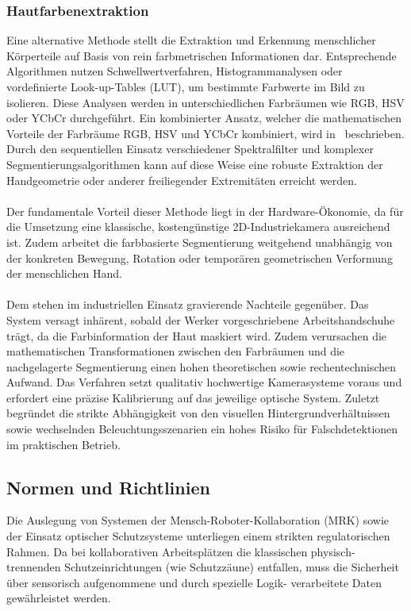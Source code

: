 \subsubsection{Hautfarbenextraktion}
Eine alternative Methode stellt die Extraktion und Erkennung menschlicher Körperteile auf Basis von rein farbmetrischen Informationen dar. Entsprechende Algorithmen nutzen Schwellwertverfahren, Histogrammanalysen oder vordefinierte Look-up-Tables (LUT), um bestimmte Farbwerte im Bild zu isolieren. Diese Analysen werden in unterschiedlichen Farbräumen wie RGB, HSV oder YCbCr durchgeführt. Ein kombinierter Ansatz, welcher die mathematischen Vorteile der Farbräume RGB, HSV und YCbCr kombiniert, wird in~\cite{Sea03} beschrieben. Durch den sequentiellen Einsatz verschiedener Spektralfilter und komplexer Segmentierungsalgorithmen kann auf diese Weise eine robuste Extraktion der Handgeometrie oder anderer freiliegender Extremitäten erreicht werden.
\\
\\Der fundamentale Vorteil dieser Methode liegt in der Hardware-Ökonomie, da für die Umsetzung eine klassische, kostengünstige 2D-Industriekamera ausreichend ist. Zudem arbeitet die farbbasierte Segmentierung weitgehend unabhängig von der konkreten Bewegung, Rotation oder temporären geometrischen Verformung der menschlichen Hand. 
\\
\\Dem stehen im industriellen Einsatz gravierende Nachteile gegenüber. Das System versagt inhärent, sobald der Werker vorgeschriebene Arbeitshandschuhe trägt, da die Farbinformation der Haut maskiert wird. Zudem verursachen die mathematischen Transformationen zwischen den Farbräumen und die nachgelagerte Segmentierung einen hohen theoretischen sowie rechentechnischen Aufwand. Das Verfahren setzt qualitativ hochwertige Kamerasysteme voraus und erfordert eine präzise Kalibrierung auf das jeweilige optische System. Zuletzt begründet die strikte Abhängigkeit von den visuellen Hintergrundverhältnissen sowie wechselnden Beleuchtungsszenarien ein hohes Risiko für Falschdetektionen im praktischen Betrieb.

\subsection{Normen und Richtlinien}
Die Auslegung von Systemen der Mensch-Roboter-Kollaboration (MRK) sowie der Einsatz optischer Schutzsysteme unterliegen einem strikten regulatorischen Rahmen. Da bei kollaborativen Arbeitsplätzen die klassischen physisch-trennenden Schutzeinrichtungen (wie Schutzzäune) entfallen, muss die Sicherheit über sensorisch aufgenommene und durch spezielle Logik- verarbeitete Daten gewährleistet werden.  

